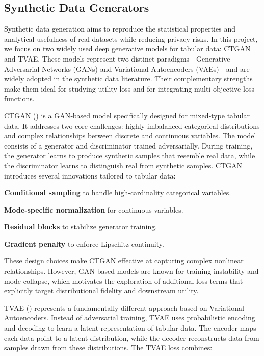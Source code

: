 \documentclass[11pt]{article}
\begin{document}
\subsection{Synthetic Data Generators}

Synthetic data generation aims to reproduce the statistical properties and analytical usefulness of real datasets while reducing privacy risks. In this project, we focus on two widely used deep generative models for tabular data: CTGAN and TVAE. These models represent two distinct paradigms—Generative Adversarial Networks (GANs) and Variational Autoencoders (VAEs)—and are widely adopted in the synthetic data literature. Their complementary strengths make them ideal for studying utility loss and for integrating multi‑objective loss functions.

CTGAN (\cite{xu2019modeling}) is a GAN‑based model specifically designed for mixed‑type tabular data. It addresses two core challenges: highly imbalanced categorical distributions and complex relationships between discrete and continuous variables. The model consists of a generator and discriminator trained adversarially. During training, the generator learns to produce synthetic samples that resemble real data, while the discriminator learns to distinguish real from synthetic samples.
CTGAN introduces several innovations tailored to tabular data:

\textbf{Conditional sampling} to handle high‑cardinality categorical variables.

\textbf{Mode‑specific normalization} for continuous variables.

\textbf{Residual blocks} to stabilize generator training.

\textbf{Gradient penalty} to enforce Lipschitz continuity.


These design choices make CTGAN effective at capturing complex nonlinear relationships. However, GAN‑based models are known for training instability and mode collapse, which motivates the exploration of additional loss terms that explicitly target distributional fidelity and downstream utility.

TVAE (\cite{xu2018synthesizing}) represents a fundamentally different approach based on Variational Autoencoders. Instead of adversarial training, TVAE uses probabilistic encoding and decoding to learn a latent representation of tabular data. The encoder maps each data point to a latent distribution, while the decoder reconstructs data from samples drawn from these distributions.
The TVAE loss combines:
\end{document}
